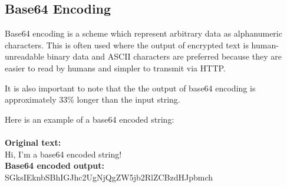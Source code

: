 \subsection{Base64 Encoding}
\label{sec:base64}

Base64 encoding is a scheme which represent arbitrary data as alphanumeric
characters. This is often used where the output of encrypted text is
human-unreadable binary data and ASCII characters are preferred because they are
easier to read by humans and simpler to transmit via HTTP.

It is also important to note that the the output of base64 encoding is approximately
33\% longer than the input string.

Here is an example of a base64 encoded string:\\\\
\textbf{Original text:}\\
Hi, I'm a base64 encoded string!\\
\textbf{Base64 encoded output:}\\
SGksIEknbSBhIGJhc2UgNjQgZW5jb2RlZCBzdHJpbmch
